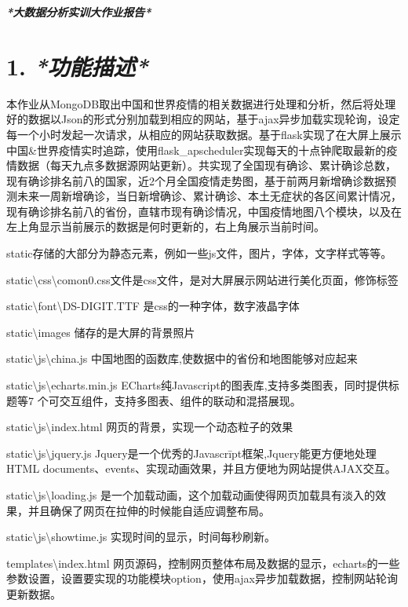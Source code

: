 \documentclass[
]{article}
\author{}
\date{}
\begin{document}
\emph{\textbf{*大数据分析实训大作业报告*}}

\hypertarget{1-ux529fux80fdux63cfux8ff0}{%
\section{\texorpdfstring{\textbf{1.}
\emph{\textbf{*功能描述*}}}{1. *功能描述*}}\label{1-ux529fux80fdux63cfux8ff0}}

本作业从MongoDB取出中国和世界疫情的相关数据进行处理和分析，然后将处理好的数据以Json的形式分别加载到相应的网站，基于ajax异步加载实现轮询，设定每一个小时发起一次请求，从相应的网站获取数据。基于flask实现了在大屏上展示中国\&世界疫情实时追踪，使用flask\_apscheduler实现每天的十点钟爬取最新的疫情数据（每天九点多数据源网站更新）。共实现了全国现有确诊、累计确诊总数，现有确诊排名前八的国家，近2个月全国疫情走势图，基于前两月新增确诊数据预测未来一周新增确诊，当日新增确诊、累计确诊、本土无症状的各区间累计情况，现有确诊排名前八的省份，直辖市现有确诊情况，中国疫情地图八个模块，以及在左上角显示当前展示的数据是何时更新的，右上角展示当前时间。

static存储的大部分为静态元素，例如一些js文件，图片，字体，文字样式等等。

static\textbackslash css\textbackslash comon0.css文件是css文件，是对大屏展示网站进行美化页面，修饰标签

static\textbackslash font\textbackslash DS-DIGIT.TTF
是css的一种字体，数字液晶字体

static\textbackslash images 储存的是大屏的背景照片

static\textbackslash js\textbackslash china.js
中国地图的函数库,使数据中的省份和地图能够对应起来

static\textbackslash js\textbackslash echarts.min.js
ECharts纯Javascript的图表库,支持多类图表，同时提供标题等7
个可交互组件，支持多图表、组件的联动和混搭展现。

static\textbackslash js\textbackslash index.html
网页的背景，实现一个动态粒子的效果

static\textbackslash js\textbackslash jquery.js
Jquery是一个优秀的Javascrīpt框架,Jquery能更方便地处理HTML
documents、events、实现动画效果，并且方便地为网站提供AJAX交互。

static\textbackslash js\textbackslash loading.js
是一个加载动画，这个加载动画使得网页加载具有淡入的效果，并且确保了网页在拉伸的时候能自适应调整布局。

static\textbackslash js\textbackslash showtime.js
实现时间的显示，时间每秒刷新。

templates\textbackslash index.html
网页源码，控制网页整体布局及数据的显示，echarts的一些参数设置，设置要实现的功能模块option，使用ajax异步加载数据，控制网站轮询更新数据。
\end{document}
